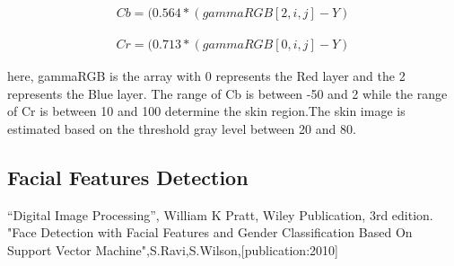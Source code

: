 \documentclass[journal]{IEEEtran}
\begin{document}
	\begin{equation}
	\begin{split}
	Cb=(0.564*(gammaRGB[2,i,j]-Y)
	\end{split}
	\end{equation}
	
	
	\begin{equation}
	\begin{split}
	Cr=(0.713*(gammaRGB[0,i,j]-Y)
	\end{split}
	\end{equation}
	
	 here, gammaRGB is the array with 0 represents the Red
	layer and the 2 represents the Blue layer. The range of Cb
	is between -50 and 2 while the range of Cr is between 10
	and 100 determine the skin region.The skin image is estimated based on the threshold
	gray level between 20 and 80.
	
	\subsection{\textbf{Facial Features Detection}}
	
	
	
	
	\begin{thebibliography}{1}
	“Digital Image Processing”, William K Pratt, Wiley
	Publication, 3rd edition.
	"Face Detection with Facial Features and Gender Classification Based On
	Support Vector Machine",S.Ravi,S.Wilson,[publication:2010]
	
	\end{thebibliography}
	
	
	
\end{document}
